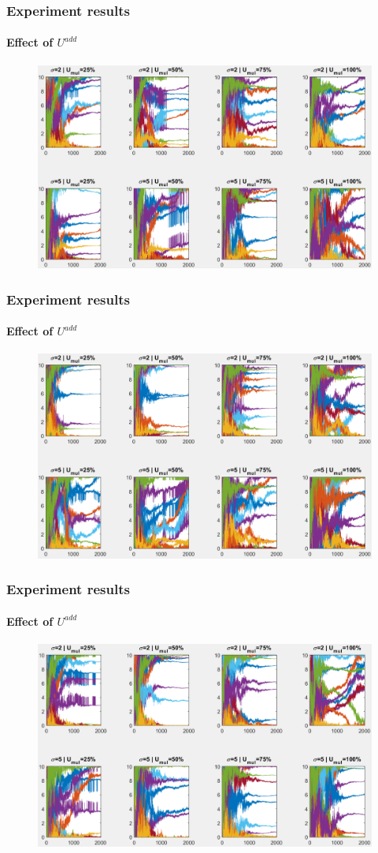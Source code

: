 \documentclass[fleqn]{beamer}
\begin{document}
\begin{frame}
	\frametitle{Experiment results}
	\framesubtitle{Effect of $U^{add}$}
	\begin{figure}
		\centering
		\includegraphics[width=4.5in]{figures/results_figures/Uadd/knobs_Uadd_25_lambda_11.png}
	\end{figure}
\end{frame}

\begin{frame}
	\frametitle{Experiment results}
	\framesubtitle{Effect of $U^{add}$}
	\begin{figure}
		\centering
		\includegraphics[width=4.5in]{figures/results_figures/Uadd/knobs_Uadd_5_lambda_11.png}
	\end{figure}
\end{frame}

\begin{frame}
	\frametitle{Experiment results}
	\framesubtitle{Effect of $U^{add}$}
	\begin{figure}
		\centering
		\includegraphics[width=4.5in]{figures/results_figures/Uadd/knobs_Uadd_10_lambda_11.png}
	\end{figure}
\end{frame}
\end{document}

